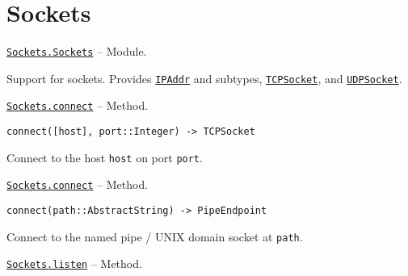 \hypertarget{3574674985174674746}{}


\chapter{Sockets}


\hypertarget{16889258743067172297}{} 
\hyperlink{16889258743067172297}{\texttt{Sockets.Sockets}}  -- {Module.}

\begin{adjustwidth}{2em}{0pt}

Support for sockets. Provides \hyperlink{8098410990676145612}{\texttt{IPAddr}} and subtypes, \hyperlink{5453047654537213204}{\texttt{TCPSocket}}, and \hyperlink{5627851531738059255}{\texttt{UDPSocket}}.



\end{adjustwidth}
\hypertarget{9905777280350118583}{} 
\hyperlink{9905777280350118583}{\texttt{Sockets.connect}}  -- {Method.}

\begin{adjustwidth}{2em}{0pt}


\begin{verbatim}
connect([host], port::Integer) -> TCPSocket
\end{verbatim}

Connect to the host \texttt{host} on port \texttt{port}.



\end{adjustwidth}
\hypertarget{15285016070454152057}{} 
\hyperlink{15285016070454152057}{\texttt{Sockets.connect}}  -- {Method.}

\begin{adjustwidth}{2em}{0pt}


\begin{verbatim}
connect(path::AbstractString) -> PipeEndpoint
\end{verbatim}

Connect to the named pipe / UNIX domain socket at \texttt{path}.



\end{adjustwidth}
\hypertarget{780704944207038170}{} 
\hyperlink{780704944207038170}{\texttt{Sockets.listen}}  -- {Method.}

